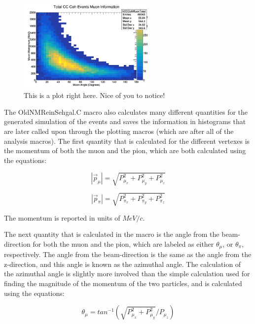 \documentclass[11pt]{article}
\begin{document}
\begin{figure}[H]
\centering
\includegraphics[width=0.6\textwidth]{OldNMReinSehgalImages/9-TotalCCCohMuonInfoNMORS.png}
\caption{This is a plot right here. Nice of you to notice!}
\end{figure}

The OldNMReinSehgal.C macro also calculates many different quantities for the generated simulation of the events and saves the information in histograms that are later called upon through the plotting macros (which are after all of the analysis macros). The first quantity that is calculated for the different vertexes is the momentum of both the muon and the pion, which are both calculated using the equations:

\begin{equation}
|\vec{p}_\mu| = \sqrt{P_{\mu_x}^2 + P_{\mu_y}^2 + P_{\mu_z}^2}
\end{equation}

\begin{equation}
|\vec{p}_\pi| = \sqrt{P_{\pi_x}^2 + P_{\pi_y}^2 + P_{\pi_z}^2}
\end{equation}

\noindent
The momentum is reported in units of $MeV/c$.

The next quantity that is calculated in the macro is the angle from the beam-direction for both the muon and the pion, which are labeled as either $\theta_\mu$, or $\theta_\pi$, respectively. The angle from the beam-direction is the same as the angle from the z-direction, and this angle is known as the azimuthal angle. The calculation of the azimuthal angle is slightly more involved than the simple calculation used for finding the magnitude of the momentum of the two particles, and is calculated using the equations:

\begin{equation}
\theta_\mu = tan^{-1}(\sqrt{P_{\mu_x}^2 + P_{\mu_y}^2}/{P_{\mu_z}})
\end{equation}
\end{document}
